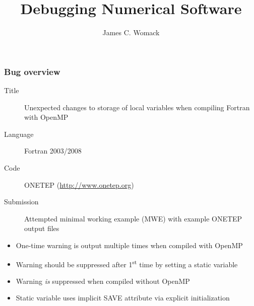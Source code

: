 \documentclass{beamer}
\title{Debugging Numerical Software}
\author{James C. Womack}
\begin{document}
\begin{frame}
  \frametitle{Bug overview}
    \begin{description}
      \item[Title] Unexpected changes to storage of local variables when compiling Fortran with OpenMP
      \item[Language] Fortran 2003/2008
      \item[Code] ONETEP (\url{http://www.onetep.org})
      \item[Submission] Attempted minimal working example (MWE)
                        with example ONETEP output files
    \end{description}
    { \footnotesize
    \begin{itemize}
      \item One-time warning is output multiple times when compiled with OpenMP
      \item Warning should be suppressed after 1\textsuperscript{st} time by setting a static variable
      \item Warning \emph{is} suppressed when compiled without OpenMP
      \item Static variable uses implicit SAVE attribute via explicit initialization

\end{itemize}}
\end{frame}
\end{document}

